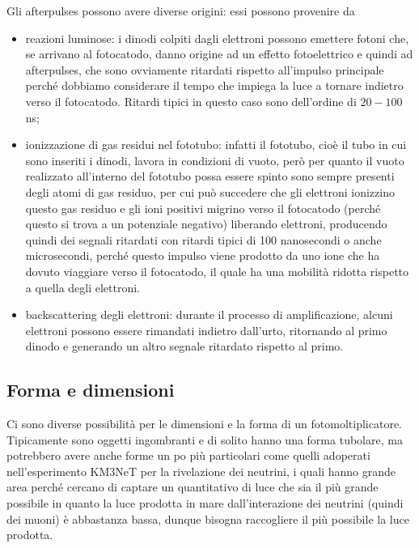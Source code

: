 Gli afterpulses possono avere diverse origini: essi possono provenire da
\begin{itemize}[leftmargin=0.5cm]
   \item reazioni luminose: i dinodi colpiti dagli elettroni possono emettere fotoni che, se arrivano al fotocatodo, danno origine ad un effetto fotoelettrico e quindi ad afterpulses, che sono ovviamente ritardati rispetto all'impulso principale perché dobbiamo considerare il tempo che impiega la luce a tornare indietro verso il fotocatodo. Ritardi tipici in questo caso sono dell'ordine di $20-100$ ns;
   \item ionizzazione di gas residui nel fototubo: infatti il fototubo, cioè il tubo in cui sono inseriti i dinodi, lavora in condizioni di vuoto, però per quanto il vuoto realizzato all'interno del fototubo possa essere spinto sono sempre presenti degli atomi di gas residuo, per cui può succedere che gli elettroni ionizzino questo gas residuo e gli ioni positivi migrino verso il fotocatodo (perché questo si trova a un potenziale negativo) liberando elettroni, producendo quindi dei segnali ritardati con ritardi tipici di 100 nanosecondi o anche microsecondi, perché questo impulso viene prodotto da uno ione che ha dovuto viaggiare verso il fotocatodo, il quale ha una mobilità ridotta rispetto a quella degli elettroni.
   \item backscattering degli elettroni: durante il processo di amplificazione, alcuni elettroni possono essere rimandati indietro dall'urto, ritornando al primo dinodo e generando un altro segnale ritardato rispetto al primo.
\end{itemize}

\subsection{Forma e dimensioni}
Ci sono diverse possibilità per le dimensioni e la forma di un fotomoltiplicatore. Tipicamente sono oggetti ingombranti e di solito hanno una forma tubolare, ma potrebbero avere anche forme un po più particolari come quelli adoperati nell'esperimento KM3NeT per la rivelazione dei neutrini, i quali hanno grande area perché cercano di captare un quantitativo di luce che sia il più grande possibile in quanto la luce prodotta in mare dall'interazione dei neutrini (quindi dei muoni) è abbastanza bassa, dunque bisogna raccogliere il più possibile la luce prodotta.

